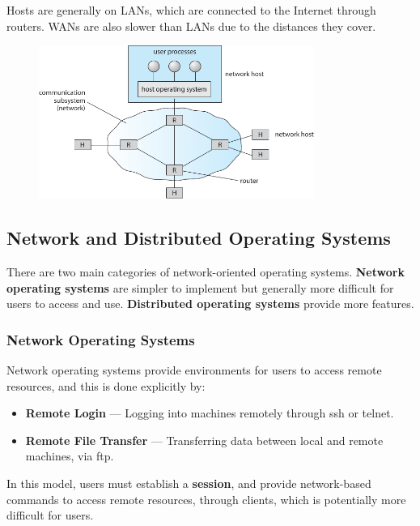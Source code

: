 \documentclass{article}
\begin{document}
Hosts are generally on LANs, which are connected to the Internet
through routers. WANs are also slower than LANs due to the distances
they cover.
\begin{figure}[H]
    \centering
    \includegraphics[height = 5cm]{figures/WAN.pdf}
\end{figure}
\subsection{Network and Distributed Operating Systems}
There are two main categories of network-oriented operating systems.
\textbf{Network operating systems} are simpler to implement but
generally more difficult for users to access and use.
\textbf{Distributed operating systems} provide more features.
\subsubsection{Network Operating Systems}
Network operating systems provide environments for users to access
remote resources, and this is done explicitly by:
\begin{itemize}
    \item \textbf{Remote Login} --- Logging into machines remotely
          through ssh or telnet.
    \item \textbf{Remote File Transfer} --- Transferring data between
          local and remote machines, via ftp.
\end{itemize}
In this model, users must establish a \textbf{session}, and provide
network-based commands to access remote resources, through clients,
which is potentially more difficult for users.
\end{document}
